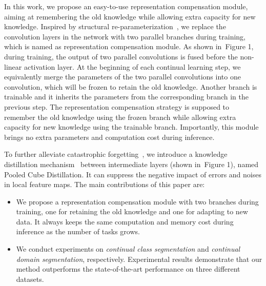 \documentclass[10pt,twocolumn,letterpaper]{article}
\newcommand{\figref}[1]{Figure 1}\newcommand{\tabref}[1]{Table 1}\newcommand{\secref}[1]{Section 1}
\newcommand{\figref}[1]{Fig.~\ref{#1}}\newcommand{\tabref}[1]{Tab.~\ref{#1}}\newcommand{\secref}[1]{Sec.~\ref{#1}}
\begin{document}
In this work, we propose an easy-to-use representation compensation module,
aiming at remembering the old knowledge
while allowing extra capacity for new knowledge.
Inspired by structural re-parameterization~\cite{ding2019acnet, ding2021repvgg},
we replace the convolution layers in the network with two parallel branches during training,
which is named as representation compensation module.
As shown in~\figref{fig:framework}, during training,
the output of two parallel convolutions is fused before the non-linear activation layer.
At the beginning of  each continual learning step,
we equivalently merge the parameters
of the two parallel convolutions into one convolution,
which will be frozen to retain the old knowledge.
Another branch is trainable and it inherits the parameters from
the corresponding branch in the previous step.
The representation compensation strategy is supposed to 
remember the old knowledge using the frozen branch
while allowing extra capacity for new knowledge using the trainable branch.
Importantly, this module brings no extra parameters and computation cost during inference.




To further alleviate catastrophic forgetting~\cite{kirkpatrick2017overcoming},
we introduce a knowledge distillation mechanism~\cite{romero2014fitnets} between intermediate layers (shown in~\figref{fig:framework}),
named Pooled Cube Distillation. It can suppress the negative impact of errors and noises in local feature maps.
The main contributions of this paper are:

\begin{itemize}
\item We propose a representation compensation module with 
two branches during training, 
one for retaining the old knowledge and 
one for adapting to new data. 
It always keeps the same computation and memory cost during inference 
as the number of tasks grows.

\item We conduct experiments on \emph{continual class segmentation} and
\emph{continual domain segmentation}, respectively.
Experimental results demonstrate that our method outperforms the state-of-the-art performance on three different datasets.

\end{itemize}
\end{document}
